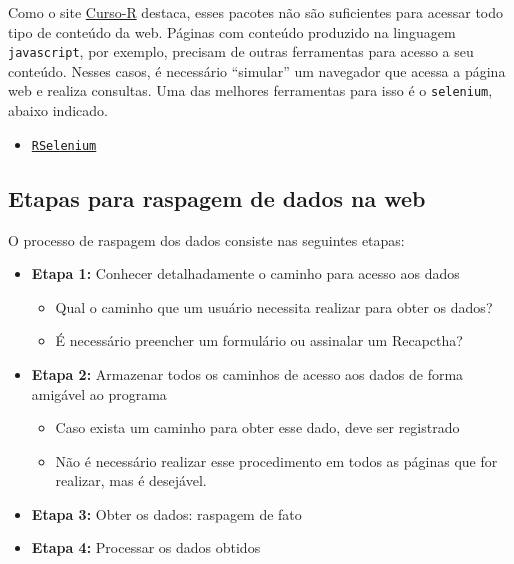\documentclass[]{book}
\providecommand{\tightlist}{%
  \setlength{\itemsep}{0pt}\setlength{\parskip}{0pt}}
\begin{document}
Como o site \href{http://material.curso-r.com/scrape/}{Curso-R} destaca, esses pacotes
não são suficientes para acessar todo tipo de conteúdo da web. Páginas com conteúdo
produzido na linguagem \texttt{javascript}, por exemplo, precisam de outras ferramentas para
acesso a seu conteúdo. Nesses casos, é necessário ``simular'' um navegador que acessa
a página web e realiza consultas. Uma das melhores ferramentas para isso é o
\texttt{selenium}, abaixo indicado.

\begin{itemize}
\tightlist
\item
  \href{https://ropensci.org/tutorials/rselenium_tutorial/}{\texttt{RSelenium}}
\end{itemize}

\hypertarget{etapas-para-raspagem-de-dados-na-web}{%
\subsection{Etapas para raspagem de dados na web}\label{etapas-para-raspagem-de-dados-na-web}}

O processo de raspagem dos dados consiste nas seguintes etapas:

\begin{itemize}
\item
  \textbf{Etapa 1:} Conhecer detalhadamente o caminho para acesso aos dados

  \begin{itemize}
  \tightlist
  \item
    Qual o caminho que um usuário necessita realizar para obter os dados?
  \item
    É necessário preencher um formulário ou assinalar um Recapctha?
  \end{itemize}
\item
  \textbf{Etapa 2:} Armazenar todos os caminhos de acesso aos dados de forma amigável ao programa

  \begin{itemize}
  \tightlist
  \item
    Caso exista um caminho para obter esse dado, deve ser registrado
  \item
    Não é necessário realizar esse procedimento em todos as páginas que for realizar, mas é desejável.
  \end{itemize}
\item
  \textbf{Etapa 3:} Obter os dados: raspagem de fato
\item
  \textbf{Etapa 4:} Processar os dados obtidos
\end{itemize}
\end{document}
